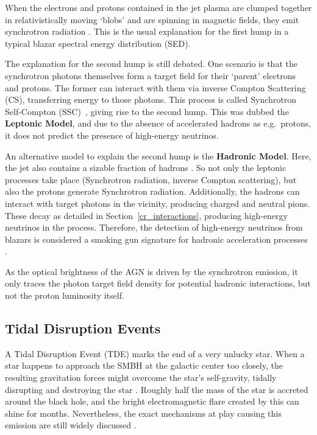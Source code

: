 When the electrons and protons contained in the jet plasma are clumped together in relativistically moving `blobs' and are spinning in magnetic fields, they emit synchrotron radiation . This is the usual explanation for the first hump in a typical blazar spectral energy distribution (SED).

The explanation for the second hump is still debated. One scenario is that the synchrotron photons themselves form a target field for their `parent' electrons and protons. The former can interact with them via inverse Compton Scattering (CS), transferring energy to those photons. This process is called Synchrotron Self-Compton (SSC)~\cite{Spurio2018}, giving rise to the second hump. This was dubbed the \textbf{Leptonic Model}, and due to the absence of accelerated hadrons as e.g.\ protons, it does not predict the presence of high-energy neutrinos.

An alternative model to explain the second hump is the \textbf{Hadronic Model}. Here, the jet also contains a sizable fraction of hadrons . So not only the leptonic processes take place (Synchrotron radiation, inverse Compton scattering), but also the protons generate Synchrotron radiation. Additionally, the hadrons can interact with target photons in the vicinity, producing charged and neutral pions. These decay as detailed in Section~\ref{cr_interactions}, producing high-energy neutrinos in the process. Therefore, the detection of high-energy neutrinos from blazars is considered a smoking gun signature for hadronic acceleration processes .

As the optical brightness of the AGN is driven by the synchrotron emission, it only traces the photon target field density for potential hadronic interactions, but not the proton luminosity itself.

\subsection{Tidal Disruption Events}

A Tidal Disruption Event (TDE) marks the end of a very unlucky star. When a star happens to approach the SMBH at the galactic center too closely, the resulting gravitation forces might overcome the star's self-gravity, tidally disrupting and destroying the star . Roughly half the mass of the star is accreted around the black hole, and the bright electromagnetic flare created by this can shine for months. Nevertheless, the exact mechanisms at play causing this emission are still widely discussed .

